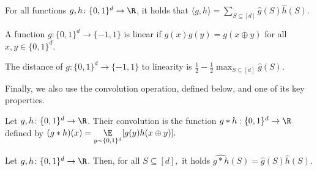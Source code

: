 \documentclass{toc}
\begin{document}
\begin{theorem} \label{thm:plancherel}
For all functions $g, h \colon\{0,1\}^d \to \R$, it holds that $ \langle g, h\rangle = \sum_{S\subseteq [d]}  \widehat{g}(S)\widehat{h}(S).$
\end{theorem}

A function $g\colon\{0,1\}^d \to \{-1,1\}$ is linear if $g(x)g(y) = g(x\oplus y)$ for all $x, y \in \{0,1\}^d$. 

\begin{lemma}\label{lem:dist_to_linearity}
The distance of $g\colon\{0,1\}^d \to \{-1,1\}$ to linearity is $\frac{1}{2} - \frac{1}{2}\max_{S\subseteq [d]}\widehat{g}(S)$. 
\end{lemma}

Finally, we also use the convolution operation, defined below, and one of its key properties. 
 
\begin{definition}[Convolution]
Let $g, h \colon\{0,1\}^d \to \R$. Their convolution is the function $g *h: \{0,1\}^d \to \R$ defined by
$
    (g * h)(x) = \underset{y\sim \{0,1\}^d}{\E}[g(y)h(x\oplus y)].
$
\end{definition}

\begin{theorem} \label{thm:convolution}
Let $g, h \colon\{0,1\}^d \to \R$. Then, for all $S \subseteq [d],$ it holds $\widehat{g * h}(S) = \widehat{g}(S)\widehat{h}(S)$. 
\end{theorem}
\end{document}
